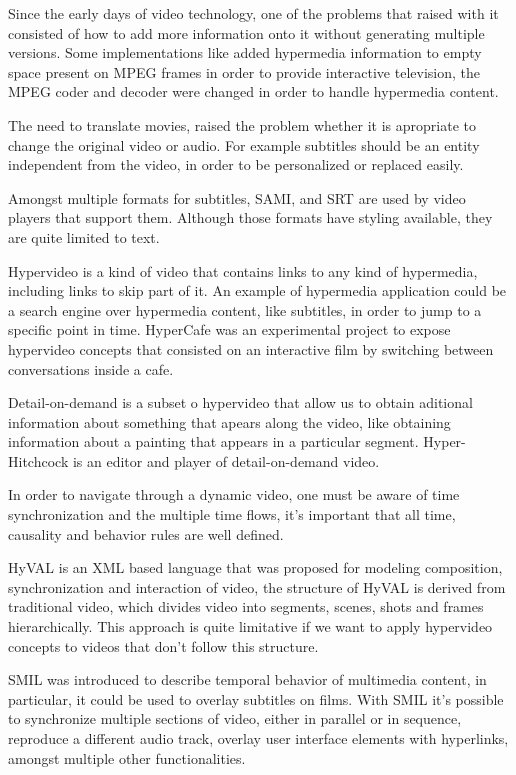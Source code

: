 
  Since the early days of video technology, one of the problems that raised with it consisted of how to add more information onto it without generating multiple versions. Some implementations like \cite{embedded} added hypermedia information to empty space present on \ac{MPEG} frames in order to provide interactive television, the \ac{MPEG} coder and decoder were changed in order to handle hypermedia content.

  The need to translate movies, raised the problem whether it is apropriate to change the original video or audio. For example subtitles should be an entity independent from the video, in order to be personalized or replaced easily.
 
  Amongst multiple formats for subtitles, \ac{SAMI}, and \ac{SRT} are used by video players that support them. Although those formats have styling available, they are quite limited to text. 

  Hypervideo is a kind of video that contains links to any kind of hypermedia, including links to skip part of it. An example of hypermedia application could be a search engine over hypermedia content, like subtitles, in order to jump to a specific point in time. HyperCafe \cite{hypercafe} was an experimental project to expose hypervideo concepts that consisted on an interactive film by switching between conversations inside a cafe.

  Detail-on-demand is a subset o hypervideo that allow us to obtain aditional information about something that apears along the video, like obtaining information about a painting that appears in a particular segment. Hyper-Hitchcock\cite{hitchcock} is an editor and player of detail-on-demand video.

  In order to navigate through a dynamic video, one must be aware of time synchronization and the multiple time flows, it's important that all time, causality and behavior rules are well defined.
 
  HyVAL\cite{hyval} is an \ac{XML} based language that was proposed for modeling composition, synchronization and interaction of video, the structure of HyVAL is derived from traditional video, which divides video into segments, scenes, shots and frames hierarchically. This approach is quite limitative if we want to apply hypervideo concepts to videos that don't follow this structure.

  \ac{SMIL}\cite{smil} was introduced to describe temporal behavior of multimedia content, in particular, it could be used to overlay subtitles on films. With \ac{SMIL} it's possible to synchronize multiple sections of video, either in parallel or in sequence, reproduce a different audio track, overlay user interface elements with hyperlinks, amongst multiple other functionalities.

